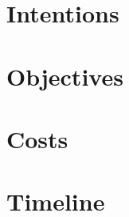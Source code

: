 \documentclass{article}
\begin{document}

\section{Intentions}

\section{Objectives}

\section{Costs}

\section{Timeline}
\end{document}
